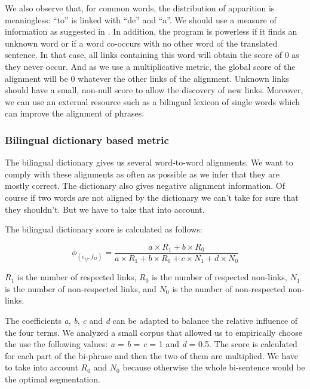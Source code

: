 \documentclass[output=paper,modfonts,nonflat]{langsci/langscibook}
\begin{document}
We also observe that, for common words, the distribution of apparition is meaningless: ``to'' is linked with ``de'' and ``a''. 
We should use a measure of information as suggested in \citep{gao1998automatic}.
In addition, the program is powerless if it finds an unknown word or if a word co-occurs with no other word of the translated sentence. 
In that case, all links containing this word will obtain the score of 0 as they never occur. 
And as we use a multiplicative metric, the global score of the alignment will be 0 whatever the other links of the alignment. Unknown links should have a small, non-null score to allow the discovery of new links. 
Moreover, we can use an external resource such as a bilingual lexicon of single words which can improve the alignment of phrases.


\subsubsection{Bilingual dictionary based metric}

The bilingual dictionary gives us several word-to-word alignments. We want to comply with these alignments as often as possible as we infer that they are mostly correct. %
The dictionary also gives negative alignment information. Of course if two words are not aligned by the dictionary we can't take for sure that they shouldn't. But we have to take that into account.

The bilingual dictionary score is calculated as follows:

\begin{equation}
\phi_(e_{ij},f_{kl})=\frac{a\times R_1 + b\times R_0}{a\times R_1 + b\times R_0 + c\times N_1 + d\times N_0}
\end{equation}

$R_1$ is the number of respected links, $R_0$ is the number of respected non-links, $N_1$ is the number of non-respected links, and $N_0$ is the number of non-respected non-links.

The coefficients \textit{a}, \textit{b}, \textit{c} and \textit{d} can be adapted to balance the relative influence of the four terms. 
We analyzed a small corpus that allowed us to empirically choose the use the following values:  \textit{a} = \textit{b} = \textit{c} = 1 and \textit{d} = 0.5. 
The score is calculated for each part of the bi-phrase and then the two of them are multiplied. We have to take into account $R_0$ and $N_0$ because otherwise the whole bi-sentence would be the optimal segmentation.
\end{document}
